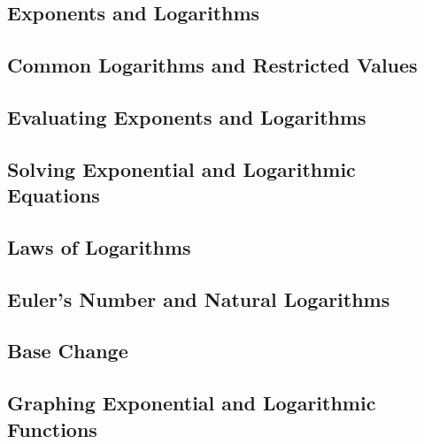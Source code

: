 \documentclass[11pt]{article}
\begin{document}
\subsection{Exponents and Logarithms}
\subsection{Common Logarithms and Restricted Values}
\subsection{Evaluating Exponents and Logarithms}
\subsection{Solving Exponential and Logarithmic Equations}
\subsection{Laws of Logarithms}
\subsection{Euler's Number and Natural Logarithms}
\subsection{Base Change}
\subsection{Graphing Exponential and Logarithmic Functions}
\end{document}
